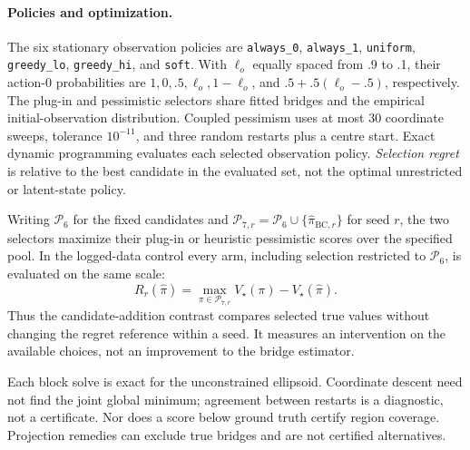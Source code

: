 \documentclass[11pt]{article}
\begin{document}
\paragraph{Policies and optimization.}
The six stationary observation policies are \texttt{always\_0},
\texttt{always\_1}, \texttt{uniform}, \texttt{greedy\_lo},
\texttt{greedy\_hi}, and \texttt{soft}. With
$\ell_o$ equally spaced from .9 to .1, their action-0 probabilities are
$1,\allowbreak0,\allowbreak.5,\allowbreak\ell_o,\allowbreak1-\ell_o$,
and $.5+.5(\ell_o-.5)$, respectively.
The plug-in and pessimistic selectors share fitted bridges and the empirical
initial-observation distribution. Coupled pessimism uses at most 30 coordinate
sweeps, tolerance $10^{-11}$, and three random restarts plus a centre start.
Exact dynamic programming evaluates each selected observation policy.
\emph{Selection regret} is relative to the best candidate in the evaluated set,
not the optimal unrestricted or latent-state policy.

Writing $\mathcal P_6$ for the fixed candidates and
$\mathcal P_{7,r}=\mathcal P_6\cup\{\hat\pi_{\mathrm{BC},r}\}$ for seed $r$,
the two selectors maximize their plug-in or heuristic pessimistic scores
over the specified pool. In the logged-data control every arm, including
selection restricted to $\mathcal P_6$, is evaluated on the same scale:
\[
 R_r(\hat\pi)=\max_{\pi\in\mathcal P_{7,r}}V_\star(\pi)
                 -V_\star(\hat\pi).
\]
Thus the candidate-addition contrast compares selected true values without
changing the regret reference within a seed. It measures an intervention on
the available choices, not an improvement to the bridge estimator.

Each block solve is exact for the unconstrained ellipsoid. Coordinate descent
need not find the joint global minimum; agreement between restarts is a
diagnostic, not a certificate. Nor does a score below ground truth certify
region coverage. Projection remedies can exclude true bridges and are not
certified alternatives.
\end{document}
